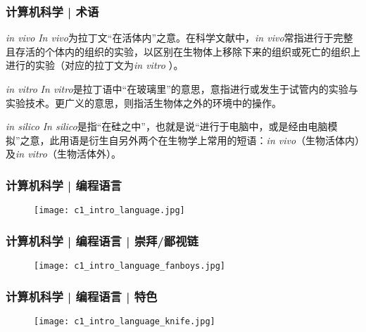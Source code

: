\begin{frame}
  \frametitle{计算机科学 | \alert{术语}}
  \begin{block}{\textit{in vivo}}
  \textit{In vivo}为拉丁文“在活体内”之意。在科学文献中，\textit{in vivo}常指进行于完整且存活的个体内的组织的实验，以区别在生物体上移除下来的组织或死亡的组织上进行的实验（对应的拉丁文为\textit{in vitro }）。
  \end{block}
  \pause
  \begin{block}{\textit{in vitro}}
    \textit{In vitro}是拉丁语中“在玻璃里”的意思，意指进行或发生于试管内的实验与实验技术。更广义的意思，则指活生物体之外的环境中的操作。
  \end{block}
  \pause
  \begin{block}{\textit{in silico}}
    \textit{In
    silico}是指“在硅之中”，也就是说“进行于电脑中，或是经由电脑模拟”之意，此用语是衍生自另外两个在生物学上常用的短语：\textit{in vivo}（生物活体内）及\textit{in vitro}（生物活体外）。
  \end{block}
\end{frame}

\begin{frame}
  \frametitle{计算机科学 | 编程语言}
  \begin{figure}
    \centering
    \texttt{[image: c1\_intro\_language.jpg]}
  \end{figure}
\end{frame}

\begin{frame}
  \frametitle{计算机科学 | 编程语言 | 崇拜/鄙视链}
  \begin{figure}
    \centering
    \texttt{[image: c1\_intro\_language\_fanboys.jpg]}
  \end{figure}
\end{frame}

\begin{frame}
  \frametitle{计算机科学 | 编程语言 | 特色}
  \begin{figure}
    \centering
    \texttt{[image: c1\_intro\_language\_knife.jpg]}
  \end{figure}
\end{frame}

